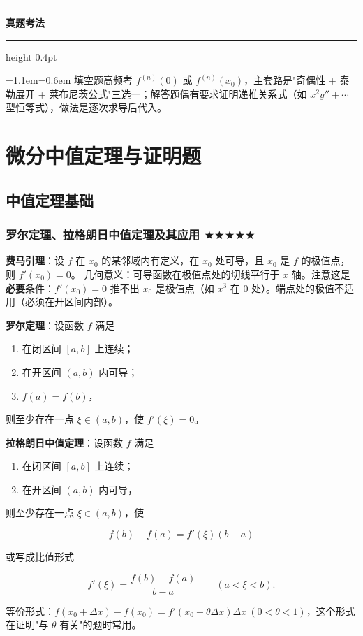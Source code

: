 \documentclass[11pt,openany,UTF8]{ctexbook}
\newcommand{\callouthead}[2]{%
  \par\addvspace{7pt}\noindent
  {\color{#1}\rule[-0.15em]{3pt}{1.05em}}\hspace{0.5em}%
  {\bfseries\color{#1}#2}\par\nobreak\vspace{-0.35em}%
  {\color{rulesep}\hrule height 0.4pt}\nobreak\vspace{0.45em}%
  \begingroup\small\setlength{\parindent}{0pt}%
  \leftskip=1.1em\rightskip=0.6em\noindent\ignorespaces}
\newcommand{\calloutend}{\par\endgroup\addvspace{7pt}}
\newenvironment{callexam}[1]{\callouthead{exambar}{#1}}{\calloutend}
\begin{document}
\begin{callexam}{真题考法}
填空题高频考 $f^{(n)}(0)$ 或 $f^{(n)}(x_0)$，主套路是"奇偶性 + 泰勒展开 + 莱布尼茨公式"三选一；解答题偶有要求证明递推关系式（如 $x^2y''+\cdots$ 型恒等式），做法是逐次求导后代入。

\end{callexam}

\section{微分中值定理与证明题}

\subsection{中值定理基础}

\subsubsection{罗尔定理、拉格朗日中值定理及其应用 $\bigstar$$\bigstar$$\bigstar$$\bigstar$$\bigstar$}

\textbf{费马引理}：设 $f$ 在 $x_0$ 的某邻域内有定义，在 $x_0$ 处可导，且 $x_0$ 是 $f$ 的极值点，则 $f'(x_0)=0$。 几何意义：可导函数在极值点处的切线平行于 $x$ 轴。注意这是\textbf{必要}条件：$f'(x_0)=0$ 推不出 $x_0$ 是极值点（如 $x^3$ 在 $0$ 处）。端点处的极值不适用（必须在开区间内部）。

\textbf{罗尔定理}：设函数 $f$ 满足

\begin{enumerate}
\item 在闭区间 $[a,b]$ 上连续；
\item 在开区间 $(a,b)$ 内可导；
\item $f(a)=f(b)$，
\end{enumerate}
则至少存在一点 $\xi\in(a,b)$，使 $f'(\xi)=0$。

\textbf{拉格朗日中值定理}：设函数 $f$ 满足

\begin{enumerate}
\item 在闭区间 $[a,b]$ 上连续；
\item 在开区间 $(a,b)$ 内可导，
\end{enumerate}
则至少存在一点 $\xi\in(a,b)$，使

\[f(b)-f(a)=f'(\xi)(b-a)\]

或写成比值形式

\[f'(\xi)=\frac{f(b)-f(a)}{b-a}\qquad(a<\xi<b).\]

等价形式：$f(x_0+\Delta x)-f(x_0)=f'(x_0+\theta\Delta x)\Delta x\ (0<\theta<1)$，这个形式在证明"与 $\theta$ 有关"的题时常用。
\end{document}
